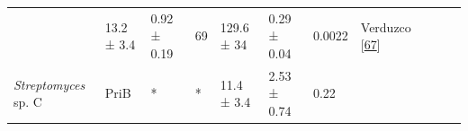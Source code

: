 \documentclass[12pt,twoside]{reedthesis}
\begin{document}
\begin{longtable}[]{@{}lllllllllll@{}}
\begin{minipage}[t]{0.04\columnwidth}
  \end{minipage} & \begin{minipage}[t]{0.06\columnwidth}\raggedright\strut
  13.2 ± 3.4\strut
  \end{minipage} & \begin{minipage}[t]{0.06\columnwidth}\raggedright\strut
  0.92 ± 0.19\strut
  \end{minipage} & \begin{minipage}[t]{0.06\columnwidth}\raggedright\strut
  69\strut
  \end{minipage} & \begin{minipage}[t]{0.05\columnwidth}\raggedright\strut
  129.6 ± 34\strut
  \end{minipage} & \begin{minipage}[t]{0.05\columnwidth}\raggedright\strut
  0.29 ± 0.04\strut
  \end{minipage} & \begin{minipage}[t]{0.03\columnwidth}\raggedright\strut
  0.0022\strut
  \end{minipage} & \begin{minipage}[t]{0.11\columnwidth}\raggedright\strut
  Verduzco
  {[}\protect\hyperlink{ref-verduzco-castro_co-occurrence_2016}{67}{]}\strut
  \end{minipage}\tabularnewline
  \begin{minipage}[t]{0.15\columnwidth}\raggedright\strut
  \emph{Streptomyces} sp. C\strut
  \end{minipage} & \begin{minipage}[t]{0.05\columnwidth}\raggedright\strut
  PriB\strut
  \end{minipage} & \begin{minipage}[t]{0.04\columnwidth}\raggedright\strut
  *\strut
  \end{minipage} & \begin{minipage}[t]{0.04\columnwidth}\raggedright\strut
  *\strut
  \end{minipage} & \begin{minipage}[t]{0.06\columnwidth}\raggedright\strut
  11.4 ± 3.4\strut
  \end{minipage} & \begin{minipage}[t]{0.06\columnwidth}\raggedright\strut
  2.53 ± 0.74\strut
  \end{minipage} & \begin{minipage}[t]{0.06\columnwidth}\raggedright\strut
  0.22\strut
  \end{minipage} & \begin{minipage}[t]{0.05\columnwidth}\raggedright\strut

\end{minipage}
\end{longtable}
\end{document}
